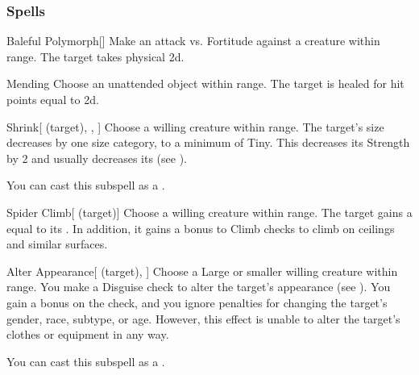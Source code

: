 \subsubsection{Spells}


\begin{ability}[\nth{1}]{Baleful Polymorph}[]
Make an attack vs. Fortitude against a creature within \rngmed range.
\hit The target takes physical  \plus2d.
\end{ability}
\vspace{0.25em}



\begin{ability}[\nth{1}]{Mending}
Choose an unattended object within \rngclose range.
The target is healed for hit points equal to  \plus2d.
\end{ability}
\vspace{0.25em}



\begin{ability}[\nth{1}]{Shrink}[ (target), , ]
Choose a willing creature within \rngclose range.
The target's size decreases by one size category, to a minimum of Tiny.
This decreases its Strength by 2 and usually decreases its  (see ).

You can cast this subspell as a .
\end{ability}
\vspace{0.25em}



\begin{ability}[\nth{1}]{Spider Climb}[ (target)]
Choose a willing creature within \rngclose range.
The target gains a  equal to its .
In addition, it gains a  bonus to Climb checks to climb on ceilings and similar surfaces.
\end{ability}
\vspace{0.25em}



\begin{ability}[\nth{2}]{Alter Appearance}[ (target), ]
Choose a Large or smaller willing creature within \rngclose range.
You make a Disguise check to alter the target's appearance (see ).
You gain a  bonus on the check, and you ignore penalties for changing the target's gender, race, subtype, or age.
However, this effect is unable to alter the target's clothes or equipment in any way.

You can cast this subspell as a .
\end{ability}
\vspace{0.25em}



